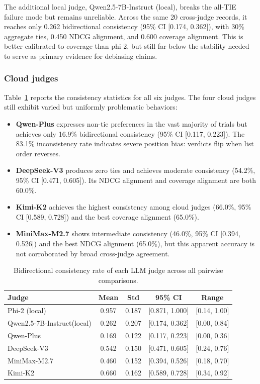 \documentclass[pdflatex,sn-basic,referee,lineno]{sn-jnl}
\begin{document}
The additional local judge, Qwen2.5-7B-Instruct (local), breaks the all-TIE failure mode but remains unreliable. Across the same 20 cross-judge records, it reaches only 0.262 bidirectional consistency (95\% CI [0.174, 0.362]), with 30\% aggregate ties, 0.450 NDCG alignment, and 0.600 coverage alignment. This is better calibrated to coverage than phi-2, but still far below the stability needed to serve as primary evidence for debiasing claims.

\subsubsection{Cloud judges}

Table~\ref{tab:consistency} reports the consistency statistics for all six judges. The four cloud judges still exhibit varied but uniformly problematic behaviors:

\begin{itemize}
\item \textbf{Qwen-Plus} expresses non-tie preferences in the vast majority of trials but achieves only 16.9\% bidirectional consistency (95\% CI [0.117, 0.223]). The 83.1\% inconsistency rate indicates severe position bias: verdicts flip when list order reverses.
\item \textbf{DeepSeek-V3} produces zero ties and achieves moderate consistency (54.2\%, 95\% CI [0.471, 0.605]). Its NDCG alignment and coverage alignment are both 60.0\%.
\item \textbf{Kimi-K2} achieves the highest consistency among cloud judges (66.0\%, 95\% CI [0.589, 0.728]) and the best coverage alignment (65.0\%).
\item \textbf{MiniMax-M2.7} shows intermediate consistency (46.0\%, 95\% CI [0.394, 0.526]) and the best NDCG alignment (65.0\%), but this apparent accuracy is not corroborated by broad cross-judge agreement.
\end{itemize}

\begin{table}[htbp]
\centering
\caption{Bidirectional consistency rate of each LLM judge across all pairwise comparisons.}
\label{tab:consistency}
\begin{tabular}{lcccc}
\hline
Judge & Mean & Std & 95\% CI & Range \\
\hline
Phi-2 (local) & 0.957 & 0.187 & [0.871, 1.000] & [0.14, 1.00] \\
Qwen2.5-7B-Instruct(local) & 0.262 & 0.207 & [0.174, 0.362] & [0.00, 0.84] \\
Qwen-Plus & 0.169 & 0.122 & [0.117, 0.223] & [0.00, 0.36] \\
DeepSeek-V3 & 0.542 & 0.150 & [0.471, 0.605] & [0.24, 0.76] \\
MiniMax-M2.7 & 0.460 & 0.152 & [0.394, 0.526] & [0.18, 0.70] \\
Kimi-K2 & 0.660 & 0.162 & [0.589, 0.728] & [0.34, 0.92] \\
\hline
\end{tabular}
\end{table}
\end{document}
